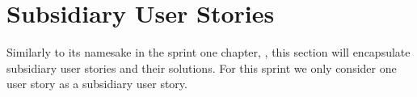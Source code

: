 \section{Subsidiary User Stories}
Similarly to its namesake in the sprint one chapter, , this section will encapsulate subsidiary user stories and their solutions.
For this sprint we only consider one user story as a subsidiary user story.

